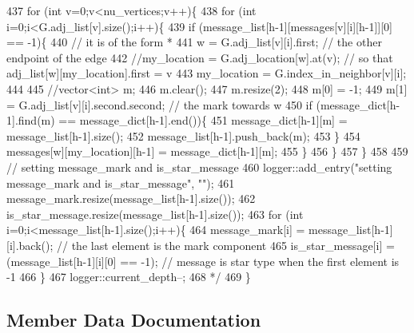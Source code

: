 \begin{DoxyCode}
437 \textcolor{comment}{  for (int v=0;v<nu\_vertices;v++)\{}
438 \textcolor{comment}{    for (int i=0;i<G.adj\_list[v].size();i++)\{}
439 \textcolor{comment}{      if (message\_list[h-1][messages[v][i][h-1]][0] == -1)\{}
440 \textcolor{comment}{        // it is of the form *}
441 \textcolor{comment}{        w = G.adj\_list[v][i].first; // the other endpoint of the edge}
442 \textcolor{comment}{        //my\_location = G.adj\_location[w].at(v); // so that adj\_list[w][my\_location].first = v}
443 \textcolor{comment}{        my\_location = G.index\_in\_neighbor[v][i];}
444 \textcolor{comment}{}
445 \textcolor{comment}{        //vector<int> m;}
446 \textcolor{comment}{        m.clear();}
447 \textcolor{comment}{        m.resize(2);}
448 \textcolor{comment}{        m[0] = -1;}
449 \textcolor{comment}{        m[1] = G.adj\_list[v][i].second.second; // the mark towards w}
450 \textcolor{comment}{        if (message\_dict[h-1].find(m) == message\_dict[h-1].end())\{}
451 \textcolor{comment}{          message\_dict[h-1][m] = message\_list[h-1].size();}
452 \textcolor{comment}{          message\_list[h-1].push\_back(m);}
453 \textcolor{comment}{        \}}
454 \textcolor{comment}{        messages[w][my\_location][h-1] = message\_dict[h-1][m];}
455 \textcolor{comment}{      \}}
456 \textcolor{comment}{    \}}
457 \textcolor{comment}{  \}}
458 \textcolor{comment}{}
459 \textcolor{comment}{  // setting message\_mark and is\_star\_message}
460 \textcolor{comment}{  logger::add\_entry("setting message\_mark and is\_star\_message", "");}
461 \textcolor{comment}{  message\_mark.resize(message\_list[h-1].size());}
462 \textcolor{comment}{  is\_star\_message.resize(message\_list[h-1].size());}
463 \textcolor{comment}{  for (int i=0;i<message\_list[h-1].size();i++)\{}
464 \textcolor{comment}{    message\_mark[i] = message\_list[h-1][i].back(); // the last element is the mark component}
465 \textcolor{comment}{    is\_star\_message[i] = (message\_list[h-1][i][0] == -1); // message is star type when the first element is
       -1}
466 \textcolor{comment}{  \}}
467 \textcolor{comment}{  logger::current\_depth--;}
468 \textcolor{comment}{  */}
469 \}
\end{DoxyCode}


\subsection{Member Data Documentation}
\mbox{\label{classgraph__message_a45dfd061b7bc73572e5132fbf66efd55}} 
